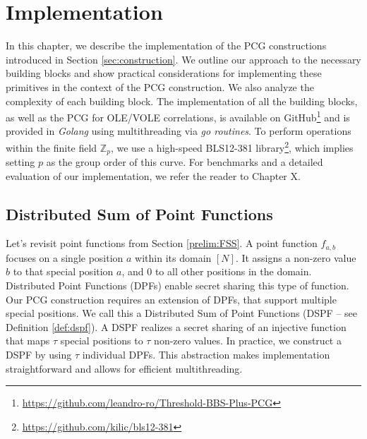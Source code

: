 \chapter{Implementation}
\label{chapter:ImplementingPCGs}
In this chapter, we describe the implementation of the PCG constructions introduced in Section \ref{sec:construction}. We outline our approach to the necessary building blocks and show practical considerations for implementing these primitives in the context of the PCG construction. We also analyze the complexity of each building block. The implementation of all the building blocks, as well as the PCG for OLE/VOLE correlations, is available on GitHub\footnote{\url{https://github.com/leandro-ro/Threshold-BBS-Plus-PCG}} and is provided in \textit{Golang} using multithreading via \textit{go routines}. To perform operations within the finite field $\mathbb{Z}_p$, we use a high-speed BLS12-381 library\footnote{\url{https://github.com/kilic/bls12-381}}, which implies setting $p$ as the group order of this curve. For benchmarks and a detailed evaluation of our implementation, we refer the reader to Chapter X.

\section{Distributed Sum of Point Functions}
Let's revisit point functions from Section \ref{prelim:FSS}.  A point function $f_{a,b}$ focuses on a single position $a$ within its domain $[N]$. It assigns a non-zero value $b$ to that special position $a$, and $0$ to all other positions in the domain. Distributed Point Functions (DPFs) enable secret sharing this type of function. Our PCG construction requires an extension of DPFs, that support multiple special positions. We call this a Distributed Sum of Point Functions (DSPF – see Definition \ref{def:dspf}). A DSPF realizes a secret sharing of an injective function that maps $\tau$ special positions to $\tau$ non-zero values. In practice, we construct a DSPF by using $\tau$ individual DPFs. This abstraction makes implementation straightforward and allows for efficient multithreading.

